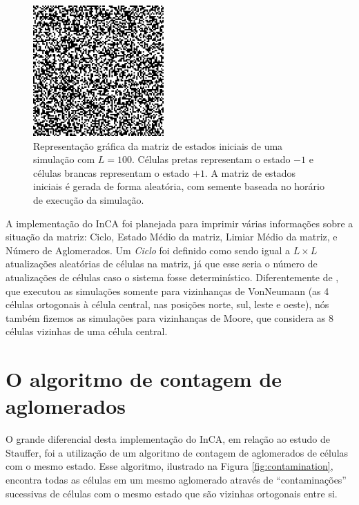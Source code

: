 \documentclass[
	12pt,				%
	openright,			%
	twoside,			%
	a4paper,			%
	english,			%
	french,				%
	spanish,			%
	brazil				%
	]{abntex2}
\begin{document}
\begin{figure}
    \centering
    \includegraphics[width=5cm]{matrizL100Ciclo0.png}
    \caption{Representação gráfica da matriz de estados iniciais de uma simulação com $L=100$. Células pretas representam o estado $-1$ e células brancas representam o estado $+1$. A matriz de estados iniciais é gerada de forma aleatória, com semente baseada no horário de execução da simulação.}
    \label{fig:matrizL100Ciclo0}
\end{figure}

A implementação do InCA foi planejada para imprimir várias informações sobre a situação da matriz: Ciclo, Estado Médio da matriz, Limiar Médio da matriz, e Número de Aglomerados. Um \textit{Ciclo} foi definido como sendo igual a $L\times L$ atualizações aleatórias de células na matriz, já que esse seria o número de atualizações de células caso o sistema fosse determinístico. Diferentemente de \cite{stauffer}, que executou as simulações somente para vizinhanças de VonNeumann (as 4 células ortogonais à célula central, nas posições norte, sul, leste e oeste), nós também fizemos as simulações para vizinhanças de Moore, que considera as 8 células vizinhas de uma célula central.

\section{O algoritmo de contagem de aglomerados}

O grande diferencial desta implementação do InCA, em relação ao estudo de Stauffer, foi a utilização de um algoritmo de contagem de aglomerados de células com o mesmo estado. Esse algoritmo, ilustrado na Figura \ref{fig:contamination}, encontra todas as células em um mesmo aglomerado através de ``contaminações'' sucessivas de células com o mesmo estado que são vizinhas ortogonais entre si.
\end{document}
